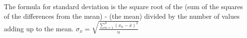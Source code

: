 The formula for standard deviation is the square root of the (sum of the squares of the differences from the mean) - (the mean) divided by the number of values adding up to the mean. 
$ \sigma_x = \sqrt{\frac{\sum_{n = 1}^{k}(x_n - \bar{x})^2}{n}} $